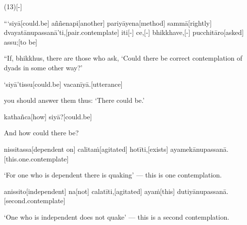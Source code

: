 \begin{samepage}
\begingl[glneveryline={\PaliGlossA,\PaliGlossB}]
(13)[-]
\endgl
\nopagebreak
\linespread{0.5}
\begin{spacin}{0.2}
{\PaliGlossFT [13. Dependency]}
\end{spacin}
\vskip 12pt
\end{samepage}
\begin{samepage}
\begingl[glneveryline={\PaliGlossA,\PaliGlossB}]
“‘siyā[could.be] aññenapi[another] pariyāyena[method] sammā[rightly] dvayatānupassanā’ti,[pair.contemplate] iti[-] ce,[-] bhikkhave,[-] pucchitāro[asked] assu;[to be]
\endgl
\nopagebreak
\linespread{0.5}
\begin{spacin}{0.2}
{\PaliGlossFT “If, bhikkhus, there are those who ask, ‘Could there be correct contemplation of dyads in some other way?’}
\end{spacin}
\vskip 12pt
\end{samepage}
\begin{samepage}
\begingl[glneveryline={\PaliGlossA,\PaliGlossB}]
‘siyā’tissu[could.be] vacanīyā.[utterance]
\endgl
\nopagebreak
\linespread{0.5}
\begin{spacin}{0.2}
{\PaliGlossFT you should answer them thus: ‘There could be.’}
\end{spacin}
\vskip 12pt
\end{samepage}
\begin{samepage}
\begingl[glneveryline={\PaliGlossA,\PaliGlossB}]
kathañca[how] siyā?[could.be]
\endgl
\nopagebreak
\linespread{0.5}
\begin{spacin}{0.2}
{\PaliGlossFT And how could there be?}
\end{spacin}
\vskip 12pt
\end{samepage}
\begin{samepage}
\begingl[glneveryline={\PaliGlossA,\PaliGlossB}]
nissitassa[dependent on] calitaṁ[agitated] hotīti,[exists] ayamekānupassanā.[this.one.contemplate]
\endgl
\nopagebreak
\linespread{0.5}
\begin{spacin}{0.2}
{\PaliGlossFT ‘For one who is dependent there is quaking’ — this is one contemplation.}
\end{spacin}
\vskip 12pt
\end{samepage}
\begin{samepage}
\begingl[glneveryline={\PaliGlossA,\PaliGlossB}]
anissito[independent] na[not] calatīti,[agitated] ayaṁ[this] dutiyānupassanā.[second.contemplate]
\endgl
\nopagebreak
\linespread{0.5}
\begin{spacin}{0.2}
{\PaliGlossFT ‘One who is independent does not quake’ — this is a second contemplation.}
\end{spacin}
\vskip 12pt
\end{samepage}
